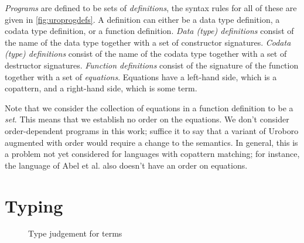 \textit{Programs} are defined to be sets of \textit{definitions}, the syntax rules for all of these are given in \autoref{fig:uroprogdefs}. A definition can either be a data type definition, a codata type definition, or a function definition. \textit{Data (type) definitions} consist of the name of the data type together with a set of constructor signatures. \textit{Codata (type) definitions} consist of the name of the codata type together with a set of destructor signatures. \textit{Function definitions} consist of the signature of the function together with a set of \textit{equations}. Equations have a left-hand side, which is a copattern, and a right-hand side, which is some term.

Note that we consider the collection of equations in a function definition to be a \textit{set}. This means that we establish no order on the equations. We don't consider order-dependent programs in this work; suffice it to say that a variant of Uroboro augmented with order would require a change to the semantics. In general, this is a problem not yet considered for languages with copattern matching; for instance, the language of Abel et al.\cite{abel13copatterns} also doesn't have an order on equations.

\section{Typing}
\label{sec:urostatsem}

\begin{figure}
\begin{prooftree}
\end{prooftree}

\begin{prooftree}
\end{prooftree}

\begin{prooftree}
\end{prooftree}

\begin{prooftree}
\end{prooftree}
\caption{Type judgement for terms}
\label{fig:typjterm}
\end{figure}

